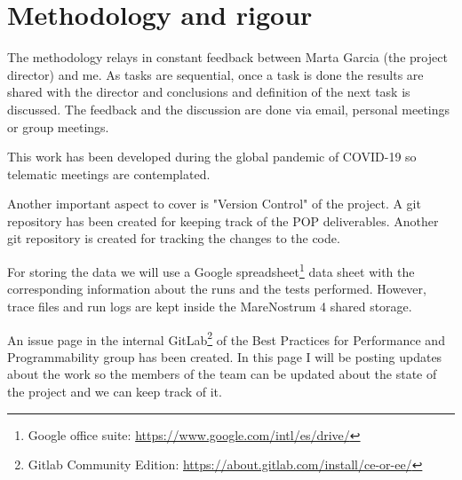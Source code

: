 \section{Methodology and rigour}

\justify
The methodology relays in constant feedback between Marta Garcia (the project director) and me. As tasks are sequential, once a task is done the results are shared with the director and conclusions and definition of the next task is discussed. The feedback and the discussion are done via email, personal meetings or group meetings.

\justify
This work has been developed during the global pandemic of COVID-19 so telematic meetings are contemplated.

\justify
Another important aspect to cover is "Version Control" of the project. A git repository has been created for keeping track of the POP deliverables. Another git repository is created for tracking the changes to the code.

\justify
For storing the data we will use a Google  spreadsheet\footnote{Google office suite: \url{https://www.google.com/intl/es/drive/}} data sheet with the corresponding information about the runs and the tests performed. However, trace files and run logs are kept inside the MareNostrum 4 shared storage.

\justify
An issue page in the internal GitLab\footnote{Gitlab Community Edition: \url{https://about.gitlab.com/install/ce-or-ee/}} of the Best Practices for Performance and Programmability group has been created. In this page I will be posting updates about the work so the members of the team can be updated about the state of the project and we can keep track of it.

\clearpage
